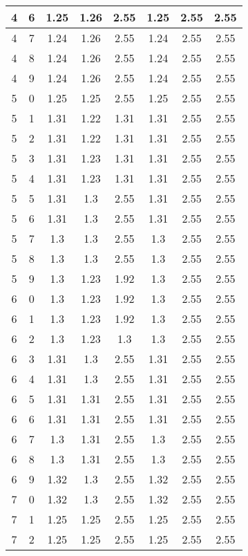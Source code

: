 \begin{longtable}{|c|c||c||c|c||c|c|c|}
	4 & 6 & 1.25 & 1.26 & 2.55 & 1.25 & 2.55 & 2.55 \\ \hline
	4 & 7 & 1.24 & 1.26 & 2.55 & 1.24 & 2.55 & 2.55 \\ \hline
	4 & 8 & 1.24 & 1.26 & 2.55 & 1.24 & 2.55 & 2.55 \\ \hline
	4 & 9 & 1.24 & 1.26 & 2.55 & 1.24 & 2.55 & 2.55 \\ \hline
	5 & 0 & 1.25 & 1.25 & 2.55 & 1.25 & 2.55 & 2.55 \\ \hline
	5 & 1 & 1.31 & 1.22 & 1.31 & 1.31 & 2.55 & 2.55 \\ \hline
	5 & 2 & 1.31 & 1.22 & 1.31 & 1.31 & 2.55 & 2.55 \\ \hline
	5 & 3 & 1.31 & 1.23 & 1.31 & 1.31 & 2.55 & 2.55 \\ \hline
	5 & 4 & 1.31 & 1.23 & 1.31 & 1.31 & 2.55 & 2.55 \\ \hline
	5 & 5 & 1.31 & 1.3 & 2.55 & 1.31 & 2.55 & 2.55 \\ \hline
	5 & 6 & 1.31 & 1.3 & 2.55 & 1.31 & 2.55 & 2.55 \\ \hline
	5 & 7 & 1.3 & 1.3 & 2.55 & 1.3 & 2.55 & 2.55 \\ \hline
	5 & 8 & 1.3 & 1.3 & 2.55 & 1.3 & 2.55 & 2.55 \\ \hline
	5 & 9 & 1.3 & 1.23 & 1.92 & 1.3 & 2.55 & 2.55 \\ \hline
	6 & 0 & 1.3 & 1.23 & 1.92 & 1.3 & 2.55 & 2.55 \\ \hline
	6 & 1 & 1.3 & 1.23 & 1.92 & 1.3 & 2.55 & 2.55 \\ \hline
	6 & 2 & 1.3 & 1.23 & 1.3 & 1.3 & 2.55 & 2.55 \\ \hline
	6 & 3 & 1.31 & 1.3 & 2.55 & 1.31 & 2.55 & 2.55 \\ \hline
	6 & 4 & 1.31 & 1.3 & 2.55 & 1.31 & 2.55 & 2.55 \\ \hline
	6 & 5 & 1.31 & 1.31 & 2.55 & 1.31 & 2.55 & 2.55 \\ \hline
	6 & 6 & 1.31 & 1.31 & 2.55 & 1.31 & 2.55 & 2.55 \\ \hline
	6 & 7 & 1.3 & 1.31 & 2.55 & 1.3 & 2.55 & 2.55 \\ \hline
	6 & 8 & 1.3 & 1.31 & 2.55 & 1.3 & 2.55 & 2.55 \\ \hline
	6 & 9 & 1.32 & 1.3 & 2.55 & 1.32 & 2.55 & 2.55 \\ \hline
	7 & 0 & 1.32 & 1.3 & 2.55 & 1.32 & 2.55 & 2.55 \\ \hline
	7 & 1 & 1.25 & 1.25 & 2.55 & 1.25 & 2.55 & 2.55 \\ \hline
	7 & 2 & 1.25 & 1.25 & 2.55 & 1.25 & 2.55 & 2.55 \\ \hline

\end{longtable}
